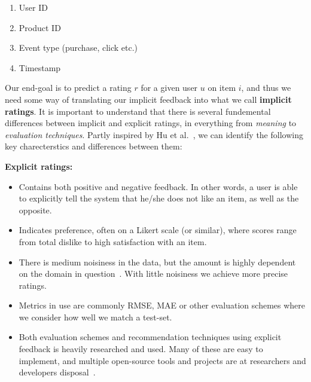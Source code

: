 \begin{enumerate}
  \item User ID
  \item Product ID
  \item Event type (purchase, click etc.)
  \item Timestamp
\end{enumerate}

Our end-goal is to predict a rating $r$ for a given user $u$ on item $i$, and
thus we need some way of translating our implicit feedback into what we call
\textbf{implicit ratings}. It is important to understand that there is several
fundemental differences between implicit and explicit ratings, in everything
from \textit{meaning} to \textit{evaluation techniques}. Partly inspired by Hu
et al.~\cite{Hu2008}, we can identify the following key charecterstics and
differences between them: 

\textbf{Explicit ratings:}
\begin{itemize}
\item Contains both positive and negative feedback. In other words, a user is
able to explicitly tell the system that he/she does not like an item, as well
as the opposite.
\item Indicates preference, often on a Likert scale (or similar), where scores
range from total dislike to high satisfaction with an item.
\item There is medium noisiness in the data, but the amount is highly dependent
on the domain in question~\cite{amatriain2009like}. With little noisiness we
achieve more precise ratings.
\item Metrics in use are commonly RMSE, MAE or other evaluation schemes where
we consider how well we match a test-set.
\item Both evaluation schemes and recommendation techniques using explicit
feedback is heavily researched and used. Many of these are easy to implement,
and multiple open-source tools and projects are at researchers and developers
disposal~\cite{something}.
\end{itemize}


